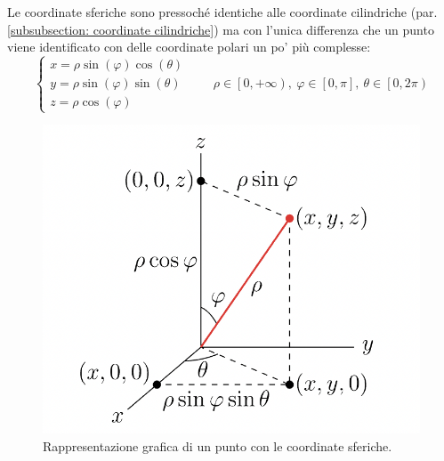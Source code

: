 \documentclass[a4paper]{article}
\begin{document}
	Le coordinate sferiche sono pressoché identiche alle coordinate cilindriche (par. \ref{subsubsection: coordinate cilindriche}) ma con l'unica differenza che un punto viene identificato con delle coordinate polari un po' più complesse:
	\begin{equation}\label{eq: conversione in coordinate sferiche}
		\begin{cases}
			x = \rho\sin\left(\varphi\right)\cos\left(\theta\right) \\
			y = \rho\sin\left(\varphi\right)\sin\left(\theta\right) \\
			z = \rho\cos\left(\varphi\right)
		\end{cases}
		\hspace{2em}
		\rho \in \left[0, +\infty\right), \: \varphi \in \left[0, \pi\right], \: \theta \in \left[0, 2\pi\right)
	\end{equation}
	\begin{figure}[!htp]
		\centering
		\includegraphics[width=.55\textwidth]{img/integrali_tripli-coordinate_sferiche.png}
		\caption{Rappresentazione grafica di un punto con le coordinate sferiche.}
	\end{figure}
\end{document}
